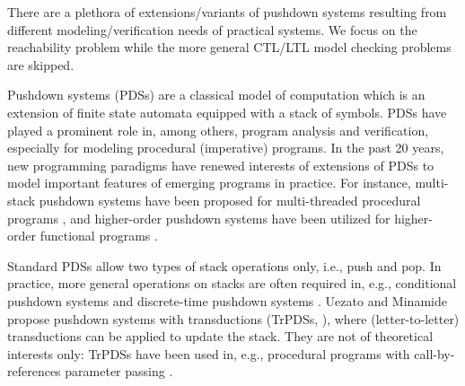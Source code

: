 

There are a plethora of extensions/variants of pushdown systems resulting from different modeling/verification needs of practical systems. 
We focus on the reachability problem while the more general CTL/LTL model checking problems are skipped. 

Pushdown systems (PDSs) are a classical model of computation which is an extension of finite state automata equipped with a stack of symbols. PDSs have played a prominent role in, among others, program analysis and verification, especially for modeling procedural (imperative) programs. In the past 20 years, new programming paradigms have renewed interests of extensions of PDSs to model important features of emerging programs in practice. For instance, 
multi-stack pushdown systems have been proposed for multi-threaded procedural programs \cite{QR05,BESS05,TMP07}, and higher-order pushdown systems have been utilized for higher-order functional programs \cite{HMOS08,HMOS17}.

Standard PDSs allow two types of stack operations only, i.e., push and pop. In practice, more general operations on stacks are often required in, e.g.,  conditional pushdown systems \cite{EKS03,LO10} and discrete-time pushdown systems \cite{AAS12}. Uezato and Minamide propose pushdown systems with transductions (TrPDSs, \cite{UM13}), where (letter-to-letter) transductions can be applied to update the stack. They are not of theoretical interests only: TrPDSs have been 
used in, e.g., procedural programs with call-by-references parameter passing \cite{SM+15,Song18}.



%

